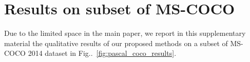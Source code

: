 \documentclass[10pt,twocolumn,letterpaper]{article}
\makeatletter
\def\@onedot{\ifx\@let@token.\else.\null\fi\xspace}
\DeclareRobustCommand\onedot{\futurelet\@let@token\@onedot}
\newcommand{\figref}[1]{Fig\onedot~\ref{#1}}
\makeatother
\begin{document}
\section{Results on subset of MS-COCO}
Due to the limited space in the main paper, we report in this supplementary material the qualitative results of our proposed methods on a subset of MS-COCO 2014 dataset \cite{lin2014microsoft} in \figref{fig:pascal_coco_results}.



\end{document}
